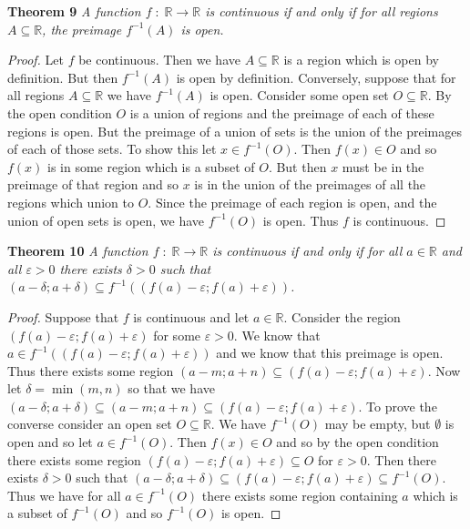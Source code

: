 \documentclass{article}
\begin{document}
\begin{flushleft}
\textbf{Theorem 9}
\textsl{A function $f \; : \; \mathbb{R} \rightarrow \mathbb{R}$ is continuous if and only if for all regions $A \subseteq \mathbb{R}$, the preimage $f^{-1}(A)$ is open.}
\begin{proof}
Let $f$ be continuous. Then we have $A \subseteq \mathbb{R}$ is a region which is open by definition. But then $f^{-1}(A)$ is open by definition. Conversely, suppose that for all regions $A \subseteq \mathbb{R}$ we have $f^{-1}(A)$ is open. Consider some open set $O \subseteq \mathbb{R}$. By the open condition $O$ is a union of regions and the preimage of each of these regions is open. But the preimage of a union of sets is the union of the preimages of each of those sets. To show this let $x \in f^{-1}(O)$. Then $f(x) \in O$ and so $f(x)$ is in some region which is a subset of $O$. But then $x$ must be in the preimage of that region and so $x$ is in the union of the preimages of all the regions which union to $O$. Since the preimage of each region is open, and the union of open sets is open, we have $f^{-1}(O)$ is open. Thus $f$ is continuous.
\end{proof}

\textbf{Theorem 10}
\textsl{A function $f \; : \; \mathbb{R} \rightarrow \mathbb{R}$ is continuous if and only if for all $a \in \mathbb{R}$ and all $\varepsilon > 0$ there exists $\delta > 0$ such that $(a - \delta ; a + \delta) \subseteq f^{-1}((f(a) - \varepsilon ; f(a) + \varepsilon))$.}
\begin{proof}
Suppose that $f$ is continuous and let $a \in \mathbb{R}$. Consider the region $(f(a) - \varepsilon ; f(a) + \varepsilon)$ for some $\varepsilon > 0$. We know that $a \in f^{-1}((f(a) - \varepsilon ; f(a) + \varepsilon))$ and we know that this preimage is open. Thus there exists some region $(a-m;a+n) \subseteq (f(a) - \varepsilon ; f(a) + \varepsilon)$. Now let $\delta = \min (m,n)$ so that we have $(a - \delta ; a + \delta) \subseteq (a-m;a+n) \subseteq (f(a) - \varepsilon ; f(a) + \varepsilon)$. To prove the converse consider an open set $O \subseteq \mathbb{R}$. We have $f^{-1}(O)$ may be empty, but $\emptyset$ is open and so let $a \in f^{-1}(O)$. Then $f(x) \in O$ and so by the open condition there exists some region $(f(a) - \varepsilon ; f(a) + \varepsilon) \subseteq O$ for $\varepsilon > 0$. Then there exists $\delta > 0$ such that $(a - \delta ; a + \delta) \subseteq (f(a) - \varepsilon ; f(a) + \varepsilon) \subseteq f^{-1} (O)$. Thus we have for all $a \in f^{-1} (O)$ there exists some region containing $a$ which is a subset of $f^{-1} (O)$ and so $f^{-1}(O)$ is open.
\end{proof}


\end{flushleft}
\end{document}
